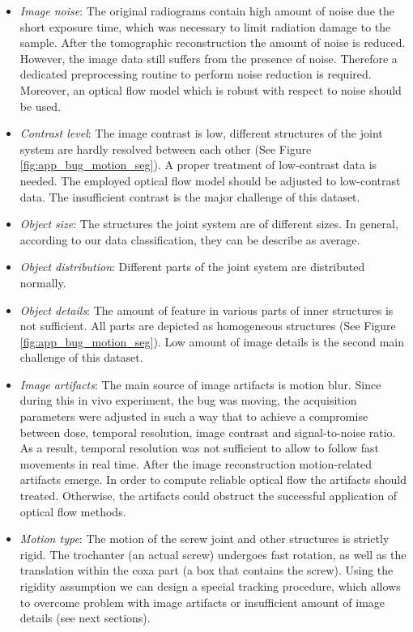 \begin{itemize}
	\item \textit{Image noise}: The original radiograms contain high amount of noise due the short exposure time, which was necessary to limit radiation damage to the sample. After the tomographic reconstruction the amount of noise is reduced. However, the image data still suffers from the presence of noise. Therefore a dedicated preprocessing routine to perform noise reduction is required. Moreover, an optical flow model which is robust with respect to noise should be used. 
	
	\item \textit{Contrast level}:  The image contrast is low, different structures of the joint system are hardly resolved between each other (See Figure \ref{fig:app_bug_motion_seg}). A proper treatment of low-contrast data is needed. The employed optical flow model should be adjusted to low-contrast data. The insufficient contrast is the major challenge of this dataset.
	
	\item \textit{Object size}: The structures the joint system are of different sizes. In general, according to our data classification, they can be describe as average. 
	
	\item \textit{Object distribution}: Different parts of the joint system are distributed normally.
	
	\item \textit{Object details}: The amount of feature in various parts of inner structures is not sufficient. All parts are depicted as homogeneous structures (See Figure \ref{fig:app_bug_motion_seg}). Low amount of image details is the second main challenge of this dataset.
	
	\item \textit{Image artifacts}: The main source of image artifacts is motion blur. Since during this in vivo experiment, the bug was moving, the acquisition parameters were adjusted in such a way that to achieve a compromise between dose, temporal resolution, image contrast and signal-to-noise ratio. As a result, temporal resolution was not sufficient to allow to follow fast movements in real time. After the image reconstruction motion-related artifacts emerge.  In order to compute reliable optical flow the artifacts should treated. Otherwise, the artifacts could obstruct the successful application of optical flow methods.  
	
	\item \textit{Motion type}: The motion of the screw joint and other structures is strictly rigid. The trochanter (an actual screw) undergoes fast rotation, as well as the translation within the coxa part (a box that contains the screw). Using the rigidity assumption we can design a special tracking procedure, which allows to overcome problem with image artifacts or insufficient amount of image details (see next sections).
	

\end{itemize}
